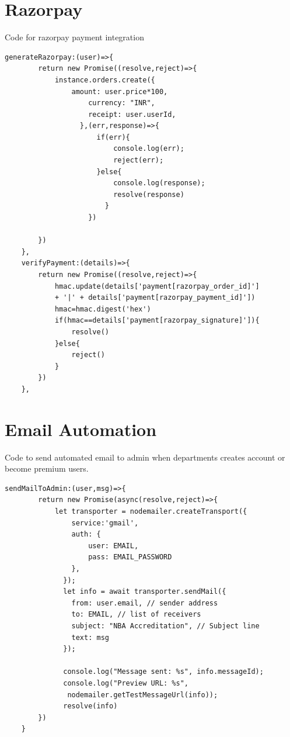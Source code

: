 \documentclass[a4paper,11pt]{report}
\begin{document}
\section{Razorpay}
Code for razorpay payment integration
\begin{verbatim}
generateRazorpay:(user)=>{
        return new Promise((resolve,reject)=>{
            instance.orders.create({
                amount: user.price*100,
                    currency: "INR",
                    receipt: user.userId,
                  },(err,response)=>{
                      if(err){
                          console.log(err);
                          reject(err);
                      }else{
                          console.log(response);
                          resolve(response)
                        }
                    })
            
        })
    },
    verifyPayment:(details)=>{
        return new Promise((resolve,reject)=>{
            hmac.update(details['payment[razorpay_order_id]'] 
            + '|' + details['payment[razorpay_payment_id]'])
            hmac=hmac.digest('hex')
            if(hmac==details['payment[razorpay_signature]']){
                resolve()
            }else{
                reject()
            }
        })
    },
\end{verbatim}

\section{Email Automation}
Code to send automated email to admin when departments creates account or become premium users.
\begin{verbatim}
sendMailToAdmin:(user,msg)=>{
        return new Promise(async(resolve,reject)=>{
            let transporter = nodemailer.createTransport({
                service:'gmail',
                auth: {
                    user: EMAIL,
                    pass: EMAIL_PASSWORD
                },
              });
              let info = await transporter.sendMail({
                from: user.email, // sender address
                to: EMAIL, // list of receivers
                subject: "NBA Accreditation", // Subject line
                text: msg
              });
            
              console.log("Message sent: %s", info.messageId);
              console.log("Preview URL: %s",
               nodemailer.getTestMessageUrl(info));
              resolve(info)
        })
    }
\end{verbatim}
\end{document}

